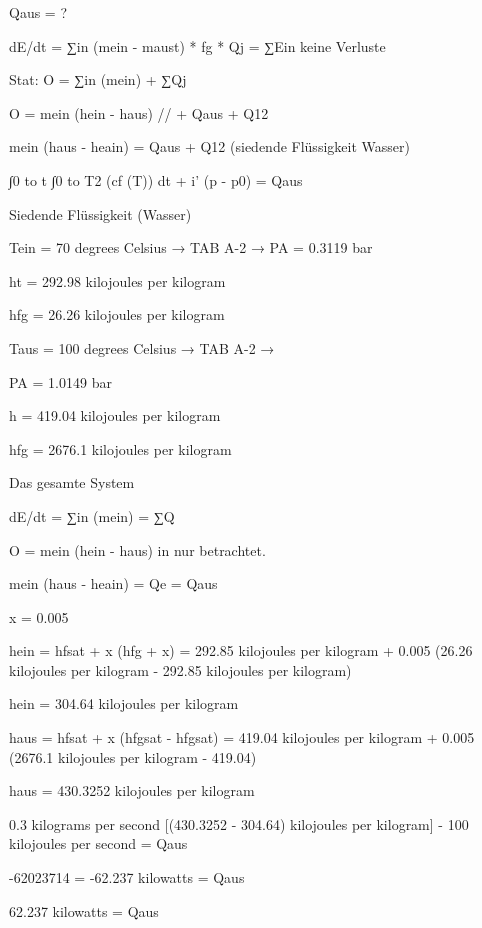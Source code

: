 Qaus = ?

dE/dt = ∑in (mein - maust) * fg * Qj = ∑Ein keine Verluste

Stat:
O = ∑in (mein) + ∑Qj

O = mein (hein - haus) // + Qaus + Q12

mein (haus - heain) = Qaus + Q12 (siedende Flüssigkeit Wasser)

∫0 to t ∫0 to T2 (cf (T)) dt + i' (p - p0) = Qaus

Siedende Flüssigkeit (Wasser)

Tein = 70 degrees Celsius → TAB A-2 → PA = 0.3119 bar

ht = 292.98 kilojoules per kilogram

hfg = 26.26 kilojoules per kilogram

Taus = 100 degrees Celsius → TAB A-2 →

PA = 1.0149 bar

h = 419.04 kilojoules per kilogram

hfg = 2676.1 kilojoules per kilogram

Das gesamte System

dE/dt = ∑in (mein) = ∑Q

O = mein (hein - haus) in nur betrachtet.

mein (haus - heain) = Qe = Qaus

x = 0.005

hein = hfsat + x (hfg + x) = 292.85 kilojoules per kilogram + 0.005 (26.26 kilojoules per kilogram - 292.85 kilojoules per kilogram)

hein = 304.64 kilojoules per kilogram

haus = hfsat + x (hfgsat - hfgsat) = 419.04 kilojoules per kilogram + 0.005 (2676.1 kilojoules per kilogram - 419.04)

haus = 430.3252 kilojoules per kilogram

0.3 kilograms per second [(430.3252 - 304.64) kilojoules per kilogram] - 100 kilojoules per second = Qaus

-62023714 = -62.237 kilowatts = Qaus

62.237 kilowatts = Qaus